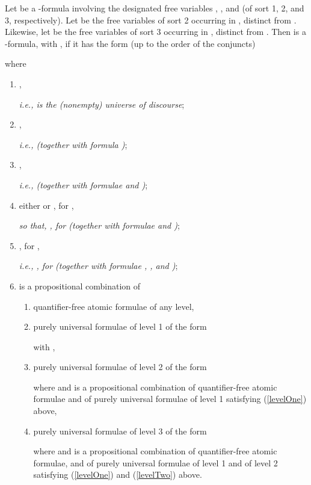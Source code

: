 \documentclass{fundam}
\begin{document}
\begin{definition}[-formulae]\label{def:hlang}
Let  be a -formula involving the designated free
variables , , and  (of sort 1, 2, and 3,
respectively).  Let  be the free variables of sort
2 occurring in , distinct from .  Likewise, let
 be the free variables of sort 3 occurring in
, distinct from . Then  is a
-formula, with , if it has the form (up to the
order of the conjuncts)

where
\begin{enumerate}
\item ,

\emph{i.e.,  is the (nonempty) universe of discourse};

\item ,

\emph{i.e.,  (together with
formula )};

\item 

      ,

\emph{i.e., 
(together with formulae  and )};

\item either  or , for ,

\emph{so that, , for 
(together with formulae  and )};

\item , for ,

\emph{i.e., , for  (together with formulae , , and
)};

\item  is a propositional combination of
\begin{enumerate}
    \item quantifier-free atomic formulae of any level,

    \item\label{levelOne} purely universal formulae of level 1 of the form
    
    with ,

    \item\label{levelTwo} purely universal formulae of level 2 of the form
    
    where  and  is a propositional combination of
    quantifier-free atomic formulae and of purely universal formulae
    of level 1 satisfying (\ref{levelOne}) above,

    \item purely universal formulae of level 3 of the form
    
    where  and  is a propositional combination of
    quantifier-free atomic formulae, and of purely universal formulae
    of level 1 and of level 2 satisfying (\ref{levelOne}) and
    (\ref{levelTwo}) above.
\end{enumerate}
\end{enumerate}

\end{definition}
\end{document}
